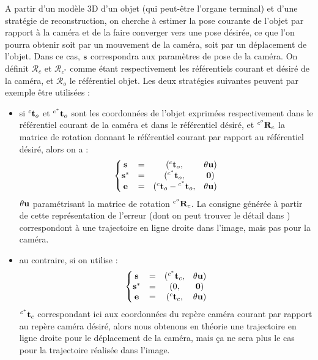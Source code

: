 A partir d'un mod\`ele 3D d'un objet (qui peut-\^etre l'organe terminal) et 
d'une strat\'egie de reconstruction, on cherche \`a estimer la pose courante de 
l'objet par rapport \`a la cam\'era et de la faire converger vers une pose 
d\'esir\'ee, ce que l'on pourra obtenir soit par un mouvement de la cam\'era, 
soit par un d\'eplacement de l'objet. Dans ce cas, ${\bf s}$ correspondra aux 
param\`etres de pose de la cam\'era. On d\'efinit $\mathcal R_c$ et $\mathcal 
R_{c^*}$ comme \'etant respectivement les r\'ef\'erentiels courant et d\'esir\'e 
de la cam\'era, et $\mathcal R_o$ le r\'ef\'erentiel objet. Les 
deux strat\'egies suivantes peuvent par exemple \^etre utilis\'ees :
\begin{itemize}
 \item si ${}^c{\bf t}_o$ et ${}^{c^*}{\bf t}_o$ sont les coordonn\'ees de 
l'objet exprim\'ees respectivement dans le r\'ef\'erentiel courant de la 
cam\'era et dans le r\'ef\'erentiel d\'esir\'e, et ${}^{c^o}{\bf R}_c$ la 
matrice de rotation donnant le r\'ef\'erentiel courant par rapport au 
r\'ef\'erentiel d\'esir\'e, alors on a :
 \begin{equation}
 \left \lbrace
 \begin{matrix}
  {\bf s} &=& ({}^c{\bf t}_o,& \theta {\bf u}) \\
  {\bf s}^* &=& ({}^{c^*}{\bf t}_o,& {\bf 0}) \\
  {\bf e} &=& ({}^c{\bf t}_o - {}^{c^*}{\bf t}_o,& \theta {\bf u})
 \end{matrix}
  \right .
\label{chap01:eq11}
\end{equation}
$\theta {\bf u}$ param\'etrisant la matrice de rotation ${}^{c^o}{\bf R}_c$. La 
consigne g\'en\'er\'ee \`a partir de cette repr\'esentation de l'erreur (dont on 
peut trouver le d\'etail dans \cite{chaumette:tuto01}) correspondont \`a une 
trajectoire en ligne droite dans l'image, mais pas pour la cam\'era.
\item au contraire, si on utilise :
\begin{equation}
 \left \lbrace
 \begin{matrix}
  {\bf s} &=& ({}^{c^*}{\bf t}_c,& \theta {\bf u}) \\
  {\bf s}^* &=& (0,& {\bf 0}) \\
  {\bf e} &=& ({}^c{\bf t}_c,& \theta {\bf u})
 \end{matrix}
  \right .
\label{chap01:eq12}
\end{equation}
${}^{c^*}{\bf t}_c$ correspondant ici aux coordonn\'ees du rep\`ere cam\'era 
courant par rapport au rep\`ere cam\'era d\'esir\'e, alors nous obtenons en 
th\'eorie une trajectoire en ligne droite pour le d\'eplacement de la cam\'era, 
mais ça ne sera plus le cas pour la trajectoire r\'ealis\'ee dans l'image. 
\end{itemize}

